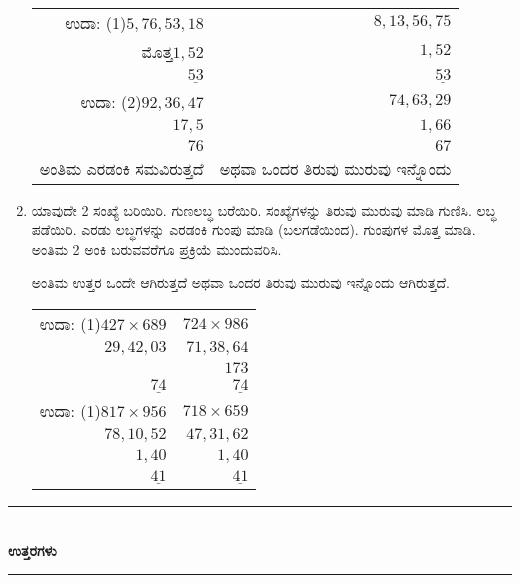 \begin{enumerate}
\begin{tabular}[t]{rr}
ಉದಾ: (1)\quad  $5,76,53,18$ & $8,13,56,75$\\
ಮೊತ್ತ\quad $1,52$ & $1,52$\\
$\underline{53}$ & $\underline{53}$\\
ಉದಾ: (2)\quad $92,36,47$  & $74,63,29$\\
$17,5$ & $1,66$\\
$76$ & $67$\\
ಅಂತಿಮ ಎರಡಂಕಿ ಸಮವಿರುತ್ತದೆ  & ಅಥವಾ ಒಂದರ ತಿರುವು ಮುರುವು ಇನ್ನೊಂದು 
\end{tabular}

\item ಯಾವುದೇ 2 ಸಂಖ್ಯೆ ಬರಿಯಿರಿ. ಗುಣಲಬ್ಧ ಬರೆಯಿರಿ. ಸಂಖ್ಯೆಗಳನ್ನು ತಿರುವು ಮುರುವು ಮಾಡಿ ಗುಣಿಸಿ. ಲಬ್ಧ ಪಡೆಯಿರಿ. ಎರಡು ಲಬ್ಧಗಳನ್ನು ಎರಡಂಕಿ ಗುಂಪು ಮಾಡಿ (ಬಲಗಡೆಯಿಂದ). ಗುಂಪುಗಳ ಮೊತ್ತ ಮಾಡಿ. ಅಂತಿಮ 2 ಅಂಕಿ ಬರುವವರೆಗೂ ಪ್ರಕ್ರಿಯೆ ಮುಂದುವರಿಸಿ. 

ಅಂತಿಮ ಉತ್ತರ ಒಂದೇ ಆಗಿರುತ್ತದೆ ಅಥವಾ ಒಂದರ ತಿರುವು ಮುರುವು ಇನ್ನೊಂದು ಆಗಿರುತ್ತದೆ. 

\begin{tabular}[t]{rr}
ಉದಾ: (1)\quad $427\times 689$ & $724\times 986$\\
$29,42,03$ & $71,38,64$\\
& $173$\\
$\underline{74}$ & $\underline{74}$\\
ಉದಾ: (1)\quad $817\times 956$ & $718\times 659$\\
$78,10,52$ & $47,31,62$\\
$1,40$ & $1,40$\\
$\underline{41}$ & $\underline{41}$
\end{tabular}
\end{enumerate}

\smallskip

\begin{center}
\rule{5cm}{1pt}\\[5pt]
{\Large\bfseries ಉತ್ತರಗಳು}\\[3pt]
\rule{5cm}{1pt}
\end{center}

